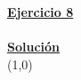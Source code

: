 \indent\underline{\textbf{Ejercicio 8}}\\
\lipsum[4]\\

\indent\underline{\textbf{Solución}}\\

\line(1,0){\textwidth}
